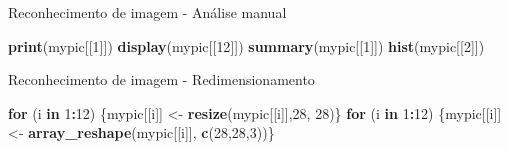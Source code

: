 \documentclass[
  ignorenonframetext,
]{beamer}
\newenvironment{Shaded}{\begin{snugshade}}{\end{snugshade}}
\newcommand{\ControlFlowTok}[1]{\textcolor[rgb]{0.13,0.29,0.53}{\textbf{#1}}}
\newcommand{\DecValTok}[1]{\textcolor[rgb]{0.00,0.00,0.81}{#1}}
\newcommand{\KeywordTok}[1]{\textcolor[rgb]{0.13,0.29,0.53}{\textbf{#1}}}
\newcommand{\NormalTok}[1]{#1}
\newcommand{\OperatorTok}[1]{\textcolor[rgb]{0.81,0.36,0.00}{\textbf{#1}}}
\newcommand{\StringTok}[1]{\textcolor[rgb]{0.31,0.60,0.02}{#1}}
\begin{document}
\begin{frame}[fragile]{Reconhecimento de imagem - Análise manual}
\protect\hypertarget{reconhecimento-de-imagem---anuxe1lise-manual}{}

\begin{Shaded}
\begin{Highlighting}[]
\KeywordTok{print}\NormalTok{(mypic[[}\DecValTok{1}\NormalTok{]])}
\KeywordTok{display}\NormalTok{(mypic[[}\DecValTok{12}\NormalTok{]])}
\KeywordTok{summary}\NormalTok{(mypic[[}\DecValTok{1}\NormalTok{]])}
\KeywordTok{hist}\NormalTok{(mypic[[}\DecValTok{2}\NormalTok{]])}
\end{Highlighting}
\end{Shaded}

\end{frame}

\begin{frame}[fragile]{Reconhecimento de imagem - Redimensionamento}
\protect\hypertarget{reconhecimento-de-imagem---redimensionamento}{}

\begin{Shaded}
\begin{Highlighting}[]
\ControlFlowTok{for}\NormalTok{ (i }\ControlFlowTok{in} \DecValTok{1}\OperatorTok{:}\DecValTok{12}\NormalTok{) \{mypic[[i]] <-}\StringTok{ }\KeywordTok{resize}\NormalTok{(mypic[[i]],}\DecValTok{28}\NormalTok{, }\DecValTok{28}\NormalTok{)\}}
\ControlFlowTok{for}\NormalTok{ (i }\ControlFlowTok{in} \DecValTok{1}\OperatorTok{:}\DecValTok{12}\NormalTok{) \{mypic[[i]] <-}\StringTok{ }\KeywordTok{array_reshape}\NormalTok{(mypic[[i]],}
                                             \KeywordTok{c}\NormalTok{(}\DecValTok{28}\NormalTok{,}\DecValTok{28}\NormalTok{,}\DecValTok{3}\NormalTok{))\}}
\end{Highlighting}
\end{Shaded}

\end{frame}
\end{document}
